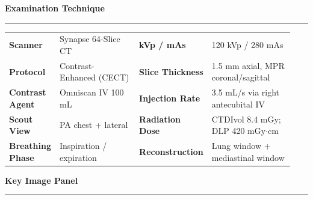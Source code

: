 \documentclass[11pt,a4paper]{article}
\newcommand{\sectionrule}{%
  \vspace{2pt}%
  {\color{RadTeal}\rule{\linewidth}{1.5pt}}%
  \vspace{4pt}%
}
\newcommand{\subsectionrule}{%
  \vspace{1pt}%
  {\color{RadRule}\rule{\linewidth}{0.5pt}}%
  \vspace{3pt}%
}
\begin{document}
\vspace{6pt}


\begin{tcolorbox}[slatebox, title=]
\noindent\textbf{\color{RadBlue}\faTools\hspace{4pt}Examination Technique}
\vspace{4pt}

\subsectionrule{}

\small\setlength{\tabcolsep}{4pt}
\begin{tabular}{@{}p{0.17\linewidth}p{0.30\linewidth}p{0.17\linewidth}p{0.30\linewidth}@{}}
  \color{RadSlate}\textbf{Scanner} & Synapse 64-Slice CT & \color{RadSlate}\textbf{kVp / mAs} & 120 kVp / 280 mAs \\[3pt]
  \color{RadSlate}\textbf{Protocol} & Contrast-Enhanced (CECT) & \color{RadSlate}\textbf{Slice Thickness} & 1.5 mm axial, MPR coronal/sagittal \\[3pt]
  \color{RadSlate}\textbf{Contrast Agent} & Omniscan IV 100 mL & \color{RadSlate}\textbf{Injection Rate} & 3.5 mL/s via right antecubital IV \\[3pt]
  \color{RadSlate}\textbf{Scout View} & PA chest + lateral & \color{RadSlate}\textbf{Radiation Dose} & CTDIvol 8.4 mGy; DLP 420 mGy$\cdot$cm \\[3pt]
  \color{RadSlate}\textbf{Breathing Phase} & Inspiration / expiration & \color{RadSlate}\textbf{Reconstruction} & Lung window + mediastinal window \\
\end{tabular}
\end{tcolorbox}

\vspace{8pt}


\noindent\textbf{\color{RadBlue}\fontsize{11}{13}\selectfont\faImage\hspace{4pt}Key Image Panel}
\vspace{4pt}

\sectionrule{}

\vspace{2pt}
\end{document}
